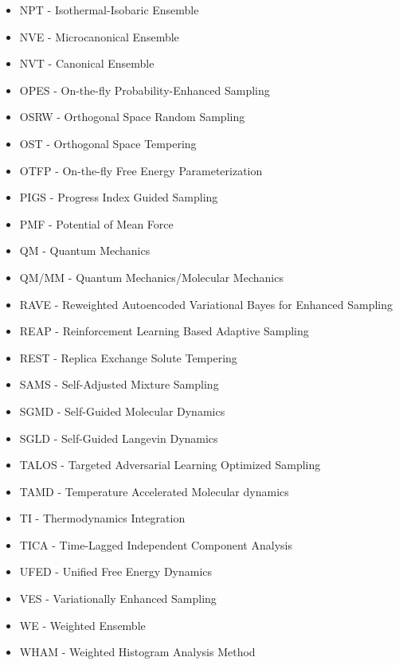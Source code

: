 \documentclass[9pt,review]{livecoms}
\begin{document}
\begin{itemize}
    \item NPT - Isothermal-Isobaric Ensemble
    \item NVE - Microcanonical Ensemble
    \item NVT - Canonical Ensemble
    \item OPES - On-the-fly Probability-Enhanced Sampling
    \item OSRW - Orthogonal Space Random Sampling
    \item OST - Orthogonal Space Tempering
    \item OTFP - On-the-fly Free Energy Parameterization
    \item PIGS - Progress Index Guided Sampling
    \item PMF - Potential of Mean Force
    \item QM - Quantum Mechanics
    \item QM/MM - Quantum Mechanics/Molecular Mechanics
    \item RAVE - Reweighted Autoencoded Variational Bayes for Enhanced Sampling
    \item REAP - Reinforcement Learning Based Adaptive Sampling
    \item REST - Replica Exchange Solute Tempering
    \item SAMS - Self-Adjusted Mixture Sampling
    \item SGMD - Self-Guided Molecular Dynamics
    \item SGLD - Self-Guided Langevin Dynamics
    \item TALOS - Targeted Adversarial Learning Optimized Sampling
    \item TAMD - Temperature Accelerated Molecular dynamics
    \item TI - Thermodynamics Integration
    \item TICA - Time-Lagged Independent Component Analysis
    \item UFED - Unified Free Energy Dynamics
    \item VES - Variationally Enhanced Sampling
    \item WE - Weighted Ensemble
    \item WHAM - Weighted Histogram Analysis Method
\end{itemize}



\end{document}
